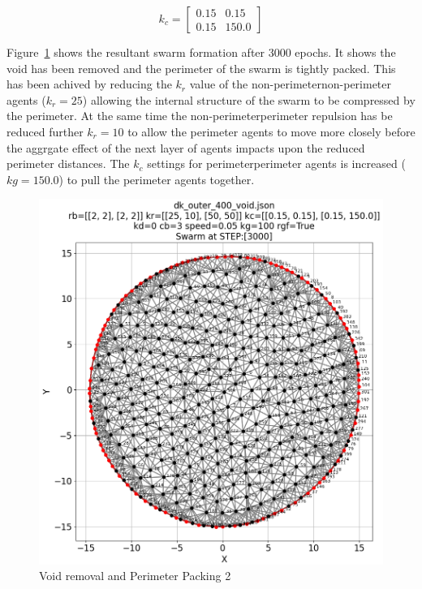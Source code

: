 \documentclass[12pt,a4paper]{IEEEtran}
\newcommand{\kc}{\mathit{k_{c}}}
\newcommand{\kr}{\mathit{k_{r}}}
\begin{document}
\begin{equation}\label{eq:voidPerim3}
	\kc = 
	\begin{bmatrix}
	0.15 & 0.15\\
	0.15 & 150.0 
	\end{bmatrix}
\end{equation}

Figure~\ref{fig:voidPerim2} shows the resultant swarm formation after 3000 epochs. It shows the void has been removed and the perimeter of the swarm is tightly packed. This has been achived by reducing the $\kr$ value of the non-perimeter\textrightarrow non-perimeter agents ($\kr=25$) allowing the internal structure of the swarm to be compressed by the perimeter. At the same time the non-perimeter\textrightarrow perimeter repulsion has be reduced further $\kr=10$ to allow the perimeter agents to move more closely before the aggrgate effect of the next layer of agents impacts upon the reduced perimeter distances. The $\kc$ settings for perimeter\textrightarrow perimeter agents is increased ($kg=150.0$) to pull the perimeter agents together.

\begin{figure}[H]
	\begin{center}
		\includegraphics[width=1.0\linewidth]{figures/voidPerim2}
	\end{center}
	\caption{Void removal and Perimeter Packing 2\label{fig:voidPerim2}}
\end{figure}
\end{document}
